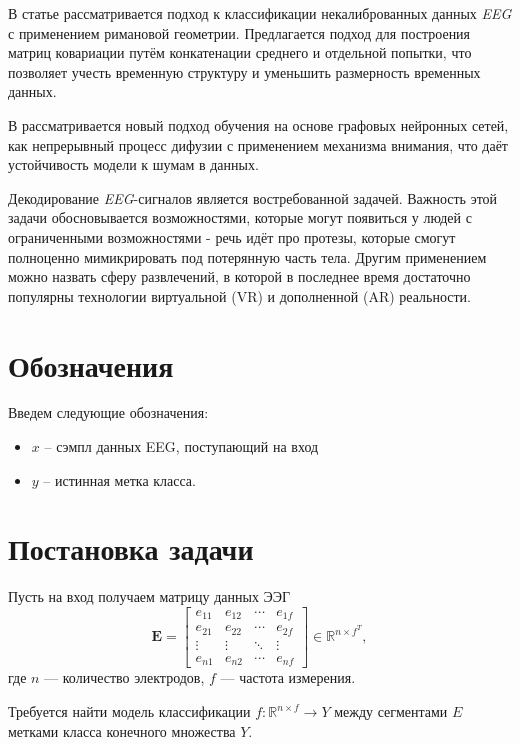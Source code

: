 \documentclass{article}
\begin{document}
\par
В статье \cite{PP2014} рассматривается подход к классификации некалиброванных данных \textit{EEG} с применением римановой геометрии. Предлагается подход для построения матриц ковариации путём конкатенации среднего и отдельной попытки, что позволяет учесть временную структуру и уменьшить размерность временных данных.
\par
В \cite{GRAND2021} рассматривается новый подход обучения на основе графовых нейронных сетей, как непрерывный процесс дифузии с применением механизма внимания, что даёт устойчивость модели к шумам в данных.
\par
Декодирование \textit{EEG}-сигналов является востребованной задачей. Важность этой задачи обосновывается возможностями, которые могут появиться у людей с ограниченными возможностями - речь идёт про протезы, которые смогут полноценно мимикрировать под потерянную часть тела. Другим применением можно назвать сферу развлечений, в которой в последнее время достаточно популярны технологии виртуальной (VR) и дополненной (AR) реальности.

\section{Обозначения}
\label{sec:headings Обозначения}
	Введем следующие обозначения:
	\begin{itemize}
		\item $x$ -- сэмпл данных EEG, поступающий на вход
		\item $y$ -- истинная метка класса.
	\end{itemize}

\section{Постановка задачи}
\label{sec:headings Постановка}
Пусть на вход получаем матрицу данных ЭЭГ 
\begin{equation}
\bm{E} = \begin{bmatrix}
e_{11} & e_{12} & \cdots & e_{1f} \\
e_{21} & e_{22} & \cdots & e_{2f} \\
\vdots & \vdots & \ddots & \vdots \\
e_{n1} & e_{n2} & \cdots & e_{nf}
\end{bmatrix}  \in {\mathbb{R}^{n \times f}^T},
\end{equation}
 где $n$ --- количество электродов, $f$ --- частота измерения.
 \par
 Требуется найти модель классификации $f: \mathbb{R}^{n \times f} \rightarrow Y$ между сегментами ${E}$ метками класса конечного множества $Y$.\\
 
\end{document}
